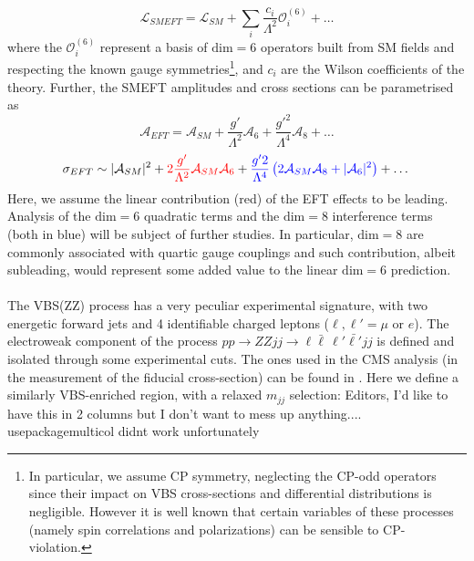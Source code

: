 \documentclass[../report.tex]{subfiles}
\begin{document}
\begin{equation}
\mathcal{L}_{SMEFT} = \mathcal{L}_{SM} + \sum_i \frac{c_i}{\Lambda^2} \mathcal{O}_i^{(6)} + \dots 
\end{equation}
%
where the $\mathcal{O}^{(6)}_i$ represent a basis of $\mathrm{dim=6}$ operators built from SM fields and respecting the known gauge symmetries\footnote{In particular, we assume CP symmetry, neglecting the CP-odd operators since their impact on VBS cross-sections and differential distributions is negligible. However it is well known that certain variables of these processes (namely spin correlations and polarizations) can be sensible to CP-violation.}, and $c_i$ are the Wilson coefficients of the theory. Further, the SMEFT amplitudes and cross sections can be parametrised as
%
\begin{equation}
\mathcal{A}_{EFT} = \mathcal{A}_{SM} + \frac{g'}{\Lambda^2} \mathcal{A}_{6} +   \frac{g'^2}{\Lambda^4} \mathcal{A}_{8} + \dots 
\end{equation}
%
\begin{equation}
 \sigma_{EFT} \sim \vert \mathcal{A}_{SM} \vert^2 + {\color{red} 2\frac{g'}{\Lambda^2} \mathcal{A}_{SM} \mathcal{A}_{6} } + {\color{blue} \frac{g'2}{\Lambda^4} \left(  2 \mathcal{A}_{SM} \mathcal{A}_{8} + \vert \mathcal{A}_{6} \vert^2 \right)} + \dots
\end{equation}
%
Here, we assume the linear contribution (red) of the EFT effects to be leading. Analysis of the $\mathrm{dim=6}$ quadratic terms and the $\mathrm{dim=8}$ interference terms (both in blue) will be subject of further studies.  In particular, $\mathrm{dim=8}$ are commonly associated with quartic gauge couplings and such contribution, albeit subleading, would represent some added value to the linear $\mathrm{dim=6}$ prediction. \\
 
\\
The VBS(ZZ) process has a very peculiar experimental signature, with two energetic forward jets and 4 identifiable charged leptons ($\ell, \ell' = \mu$ or $e$).
The electroweak component of the process $p p \to Z Z j j \to \ell \bar{\ell} \, \ell' \bar{\ell'} j j$ is defined and isolated through some experimental cuts. The ones used in the CMS analysis (in the measurement of the fiducial cross-section) can be found in \cite{Sirunyan:2017fvv}. Here we define a similarly VBS-enriched region, with a relaxed $m_{jj}$ selection: {\color{red} Editors, I'd like to have this in 2 columns but I don't want to mess up anything.... usepackage{multicol} didnt work unfortunately}
%
\end{document}
